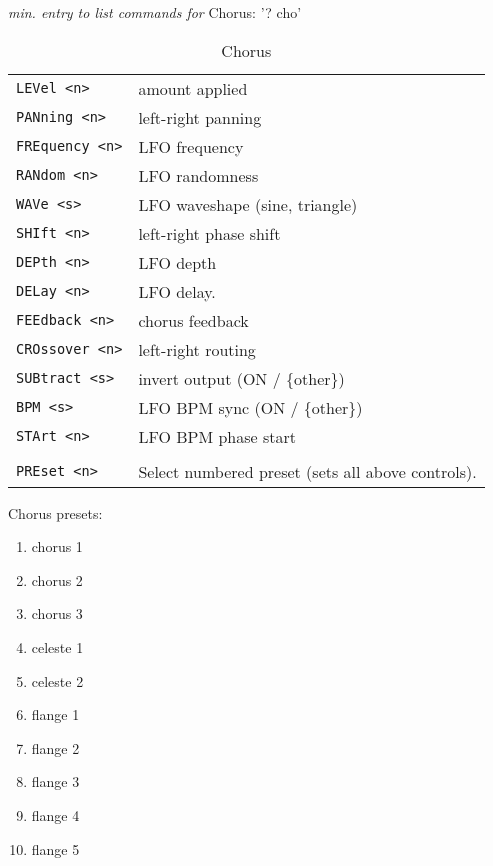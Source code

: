 \pagebreak
    \textsl{min. entry to list commands for} Chorus:  '? cho'
   \begin{table}[H]
      \centering
      \caption{Chorus}
      \begin{tabular}{l l}
\texttt{LEVel <n>} &
   amount applied \\
\texttt{PANning <n>} &
   left-right panning \\
\texttt{FREquency <n>} &
   LFO frequency \\
\texttt{RANdom <n>} &
   LFO randomness \\
\texttt{WAVe <s>} &
   LFO waveshape (sine, triangle) \\
\texttt{SHIft <n>} &
   left-right phase shift \\
\texttt{DEPth <n>} &
   LFO depth \\
\texttt{DELay <n>} &
   LFO delay.\\
\texttt{FEEdback <n>} &
   chorus feedback \\
\texttt{CROssover <n>} &
   left-right routing \\
\texttt{SUBtract <s>} &
   invert output (ON / \{other\}) \\
\texttt{BPM <s>} &
   LFO BPM sync (ON / \{other\}) \\
\texttt{STArt <n>} &
   LFO BPM phase start \\
\texttt{} & \\ %
\texttt{PREset <n>} &
   Select numbered preset (sets all above controls). \\
      \end{tabular}
   \end{table}
Chorus presets:
   \begin{enumerate}
      \item chorus 1
      \item chorus 2
      \item chorus 3
      \item celeste 1
      \item celeste 2
      \item flange 1
      \item flange 2
      \item flange 3
      \item flange 4
      \item flange 5
   \end{enumerate}

